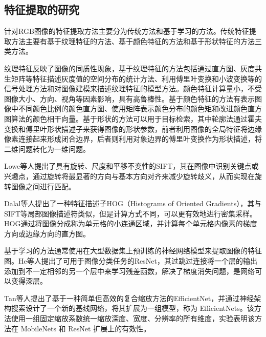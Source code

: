 

\subsection{特征提取的研究}
针对RGB图像的特征提取方法主要分为传统方法和基于学习的方法。\cite{chenSurfaceDefectDetection2021}传统特征提取方法主要有基于纹理特征的方法、基于颜色特征的方法和基于形状特征的方法三类方法。

纹理特征反映了图像的同质性现象，基于纹理特征的方法包括通过直方图、灰度共生矩阵等特征描述灰度值的空间分布的统计方法、利用傅里叶变换和小波变换等的信号处理方法和对图像建模来描述纹理特征的模型方法。颜色特征计算量小，不受图像大小、方向、视角等因素影响，具有高鲁棒性。基于颜色特征的方法有表示图像中不同颜色比例的颜色直方图、使用矩阵表示颜色分布的颜色矩和改进颜色直方图算法的颜色相干向量。基于形状的方法可以用于目标检索，其中轮廓法通过霍夫变换和傅里叶形状描述子来获得图像的形状参数，前者利用图像的全局特征将边缘像素连接起来形成闭合边界，后者则利用对象边界的傅里叶变换作为形状描述，将二维问题转化为一维问题。

Lowe等人\cite{loweDistinctiveImageFeatures2004}提出了具有旋转、尺度和平移不变性的SIFT，其在图像中识别关键点或兴趣点，通过旋转将最显著的方向与基本方向对齐来减少旋转歧义，从而实现在旋转图像之间进行匹配。

Dalal等人\cite{dalalHistogramsOrientedGradients2005}提出了一种特征描述子HOG（Histograms of Oriented Gradients），其与SIFT等局部图像描述符类似，但是计算方式不同，可以更有效地进行密集采样。HOG通过将图像分成称为单元格的小连通区域，并计算每个单元格内像素的梯度方向或边缘方向的直方图。 

基于学习的方法通常使用在大型数据集上预训练的神经网络模型来提取图像的特征图。He等人\cite{heDeepResidualLearning2016}提出了可用于图像分类任务的ResNet，其过跳过连接将一个层的输出添加到不一定相邻的另一个层中来学习残差函数，解决了梯度消失问题，是网络可以变得深层。

Tan等人\cite{tanEfficientNetRethinkingModel}提出了基于一种简单但高效的复合缩放方法的EfficientNet，并通过神经架构搜索设计了一个新的基线网络，将其扩展为一组模型，称为 EfficientNets。该方法使用一组固定缩放系数统一缩放深度、宽度、分辨率的所有维度，实验表明该方法在 MobileNets 和 ResNet 扩展上的有效性。

